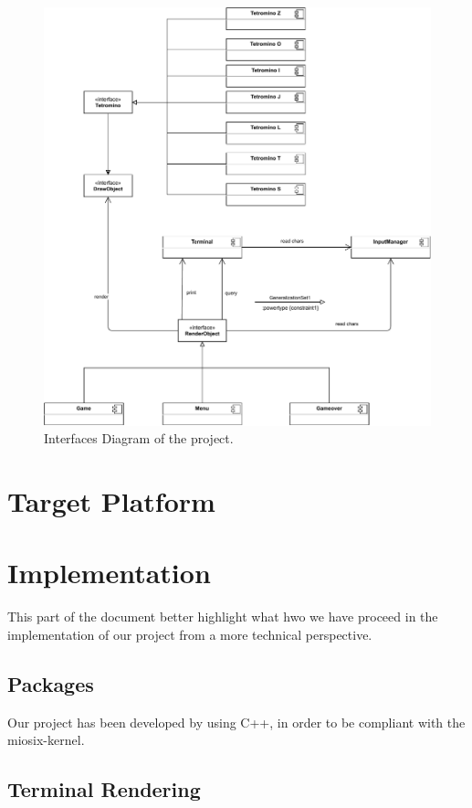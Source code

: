 \documentclass{article}
\begin{document}
\begin{figure}[H]
    \centering
    \includegraphics[width=\linewidth]{img/InterafcesDiagram.pdf}
    \caption{Interfaces Diagram of the project.}
    \label{fig:gather}
\end{figure}

\section{Target Platform}

\section{Implementation}
This part of the document better highlight what hwo we have proceed in the implementation of our project from a more technical perspective.

\subsection{Packages}
Our project has been developed by using C++\cite{slidec++}, in order to be compliant with the miosix-kernel\cite{miosix}.

\subsection{Terminal Rendering}
\end{document}
